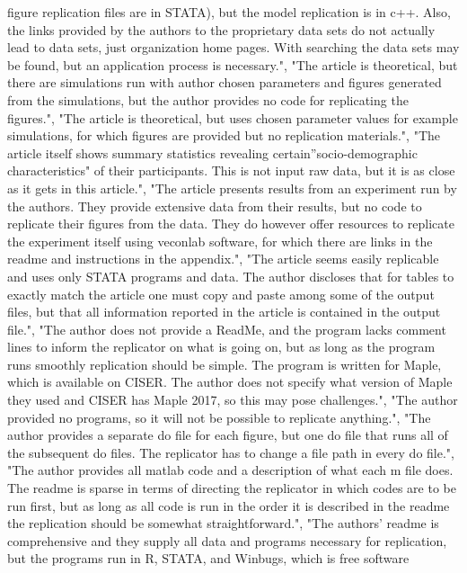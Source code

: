 \documentclass[]{article}
\begin{document}
\begin{itemize}
  figure replication files are in STATA), but the model replication is
  in c++. Also, the links provided by the authors to the proprietary
  data sets do not actually lead to data sets, just organization home
  pages. With searching the data sets may be found, but an application
  process is necessary.", "The article is theoretical, but there are
  simulations run with author chosen parameters and figures generated
  from the simulations, but the author provides no code for replicating
  the figures.", "The article is theoretical, but uses chosen parameter
  values for example simulations, for which figures are provided but no
  replication materials.", "The article itself shows summary statistics
  revealing certain''socio-demographic characteristics" of their
  participants. This is not input raw data, but it is as close as it
  gets in this article.", "The article presents results from an
  experiment run by the authors. They provide extensive data from their
  results, but no code to replicate their figures from the data. They do
  however offer resources to replicate the experiment itself using
  veconlab software, for which there are links in the readme and
  instructions in the appendix.", "The article seems easily replicable
  and uses only STATA programs and data. The author discloses that for
  tables to exactly match the article one must copy and paste among some
  of the output files, but that all information reported in the article
  is contained in the output file.", "The author does not provide a
  ReadMe, and the program lacks comment lines to inform the replicator
  on what is going on, but as long as the program runs smoothly
  replication should be simple. The program is written for Maple, which
  is available on CISER. The author does not specify what version of
  Maple they used and CISER has Maple 2017, so this may pose
  challenges.", "The author provided no programs, so it will not be
  possible to replicate anything.", "The author provides a separate do
  file for each figure, but one do file that runs all of the subsequent
  do files. The replicator has to change a file path in every do file.",
  "The author provides all matlab code and a description of what each m
  file does. The readme is sparse in terms of directing the replicator
  in which codes are to be run first, but as long as all code is run in
  the order it is described in the readme the replication should be
  somewhat straightforward.", "The authors' readme is comprehensive and
  they supply all data and programs necessary for replication, but the
  programs run in R, STATA, and Winbugs, which is free software

\end{itemize}
\end{document}
